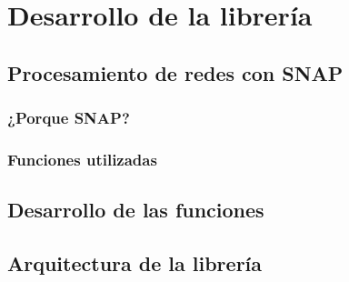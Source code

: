 \section{Desarrollo de la librería}

\subsection{Procesamiento de redes con SNAP}

\subsubsection{¿Porque SNAP?}

\subsubsection{Funciones utilizadas}

\subsection{Desarrollo de las funciones}



\subsection{Arquitectura de la librería}